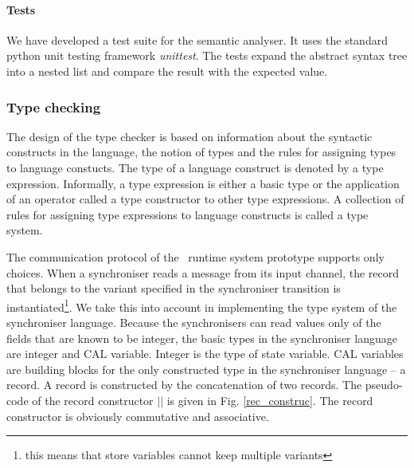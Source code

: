 

    \paragraph{Tests}
We have developed a test suite for the semantic analyser. It uses the standard python unit testing framework \emph{unittest}. The tests expand the abstract syntax tree into a nested list and compare the result with the expected value.


  \subsubsection{Type checking}\label{type_check}
The design of the type checker is based on information about the syntactic constructs in the language, the notion of types and the rules for assigning types to language constucts. The type of a language construct is denoted by a type expression. Informally, a type expression is either a basic type or the application of an operator called a type constructor to other type expressions. A collection of rules for assigning type expressions to language constructs is called a type system.

The communication protocol of the \ak\ runtime system prototype supports only choices. When a synchroniser reads a message from its input channel, the record that belongs to the variant specified in the synchroniser transition is instantiated\footnote{this means that store variables cannot keep multiple variants}. We take this into account in implementing the type system of the synchroniser language. Because the synchronisers can read values only of the fields that are known to be integer, the basic types in the synchroniser language are integer and CAL variable. Integer is the type of state variable. CAL variables are building blocks for the only constructed type in the synchroniser language -- a record. A record is constructed by the concatenation of two records. The pseudo-code of the record constructor $||$ is given in Fig. \ref{rec_construc}. The record constructor is obviously commutative and associative.

